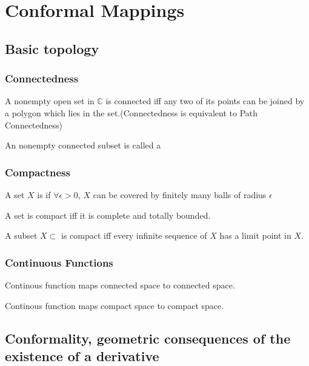 \section{Conformal Mappings}
\subsection{Basic topology}
\subsubsection{Connectedness}
\begin{theorem}
    A nonempty open set in  $ \mathbb{C} $ is connected iff any two of its points can be joined by a polygon  which lies in the set.(\ie Connectedness is equivalent to Path Connectedness)
\end{theorem}
An nonempty connected subset is called a 
\subsubsection{Compactness}
\begin{definition}
    A set  $ X  $ is  if  $ \forall \epsilon>0  $,  $ X  $ can be covered by finitely many balls of radius  $ \epsilon  $ 
    
\end{definition}
\begin{theorem}
    A set is compact iff it is complete and totally bounded.
\end{theorem}
\begin{theorem}
    A subset  $ X\subset $ is compact iff every infinite sequence of  $ X  $ has a limit point in  $ X  $.
\end{theorem}
\subsubsection{Continuous Functions}
\begin{theorem}
    Continous function maps connected space to connected space.
\end{theorem}
\begin{theorem}
    Continous function maps compact space to compact space.
\end{theorem}
\subsection{Conformality, geometric consequences of the existence of a derivative}
